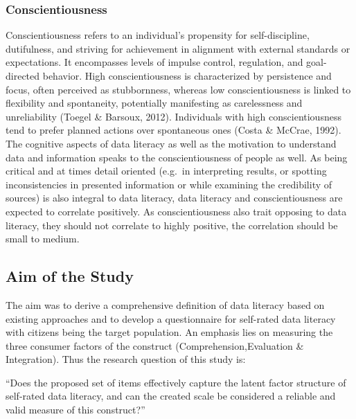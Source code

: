 \documentclass[
  12pt,
  a4paper,
  twoside]{article}
\begin{document}
\subsubsection{Conscientiousness}\label{conscientiousness}

Conscientiousness refers to an individual's propensity for self-discipline, dutifulness, and striving for achievement in alignment with external standards or expectations. It encompasses levels of impulse control, regulation, and goal-directed behavior. High conscientiousness is characterized by persistence and focus, often perceived as stubbornness, whereas low conscientiousness is linked to flexibility and spontaneity, potentially manifesting as carelessness and unreliability (Toegel \& Barsoux, 2012). Individuals with high conscientiousness tend to prefer planned actions over spontaneous ones (Costa \& McCrae, 1992).\\
The cognitive aspects of data literacy as well as the motivation to understand data and information speaks to the conscientiousness of people as well. As being critical and at times detail oriented (e.g.~in interpreting results, or spotting inconsistencies in presented information or while examining the credibility of sources) is also integral to data literacy, data literacy and conscientiousness are expected to correlate positively. As conscientiousness also trait opposing to data literacy, they should not correlate to highly positive, the correlation should be small to medium.

\subsection{Aim of the Study}\label{aim-of-the-study}

The aim was to derive a comprehensive definition of data literacy based on existing approaches and to develop a questionnaire for self-rated data literacy with citizens being the target population. An emphasis lies on measuring the three consumer factors of the construct (Comprehension,Evaluation \& Integration). Thus the research question of this study is:

``Does the proposed set of items effectively capture the latent factor structure of self-rated data literacy, and can the created scale be considered a reliable and valid measure of this construct?''
\end{document}
